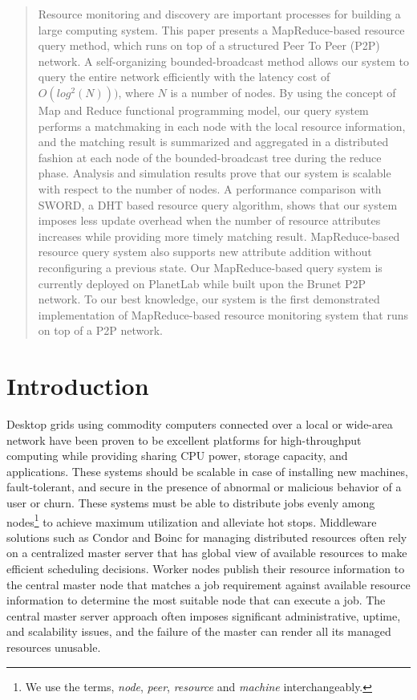 \documentclass{acm_proc_article-sp}
\begin{document}
\begin{abstract}
Resource monitoring and discovery are important processes for building a large computing system.
This paper presents a MapReduce-based resource query method, which runs on top of a structured Peer To Peer (P2P) network.
A self-organizing bounded-broadcast method allows our system to query the entire network efficiently with the latency cost of $O(log^2(N)))$, where $N$ is a number of nodes.
By using the concept of Map and Reduce functional programming model, our query system performs a matchmaking in each node with the local resource information,
and the matching result is summarized and aggregated in a distributed fashion at each node of the bounded-broadcast tree during the reduce phase.
Analysis and simulation results prove that our system is scalable with respect to the number of nodes. A performance comparison with SWORD, a DHT based resource query algorithm,
shows that our system imposes less update overhead when the number of resource attributes increases while providing more timely matching result.
MapReduce-based resource query system also supports new attribute addition without reconfiguring a previous state.
Our MapReduce-based query system is currently deployed on PlanetLab while built upon the Brunet P2P network. To our best knowledge, our system is the first demonstrated implementation of MapReduce-based resource monitoring system that runs on top of a P2P network.
\end{abstract}
\section{Introduction}
Desktop grids\cite{bonic}\cite{condor} using commodity computers connected over a local or wide-area network have been proven to be excellent platforms 
for high-throughput computing while providing sharing CPU power, storage  capacity, and applications.
These systems should be scalable in case of installing new machines, fault-tolerant, and secure in the presence of abnormal or malicious behavior of a user or churn. 
These systems must be able to distribute jobs evenly among nodes\footnote{We use the terms, \textit{node}, \textit{peer}, \textit{resource} and \textit{machine} interchangeably.} to achieve maximum utilization and alleviate hot stops. 
Middleware solutions such as Condor\cite{condor} and Boinc\cite{bonic} for managing distributed resources often rely on a centralized master server that has global view of available resources to make efficient scheduling decisions. 
Worker nodes publish their resource information to the central master node that matches a job requirement against available resource information to determine the most suitable node that can execute a job. 
The central master server approach often imposes significant administrative, uptime, and scalability issues, and the failure of the master can render all its managed resources unusable.  
\end{document}
